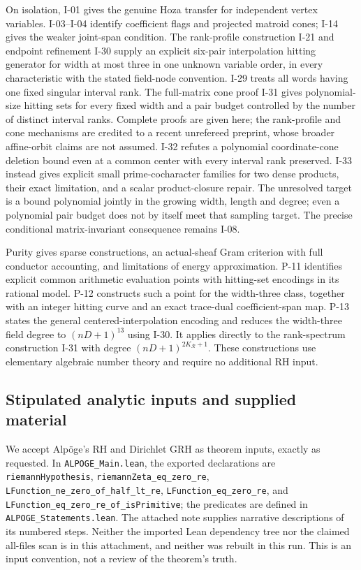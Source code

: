 \documentclass[11pt,a4paper]{article}
\theoremstyle{definition}\newtheorem{definition}{Definition}
\begin{document}
On isolation, I-01 gives the genuine Hoza transfer for independent vertex variables. I-03--I-04 identify coefficient flags and projected matroid cones; I-14 gives the weaker joint-span condition. The rank-profile construction I-21 and endpoint refinement I-30 supply an explicit six-pair interpolation hitting generator for width at most three in one unknown variable order, in every characteristic with the stated field-node convention. I-29 treats all words having one fixed singular interval rank. The full-matrix cone proof I-31 gives polynomial-size hitting sets for every fixed width and a pair budget controlled by the number of distinct interval ranks. Complete proofs are given here; the rank-profile and cone mechanisms are credited to a recent unrefereed preprint, whose broader affine-orbit claims are not assumed. I-32 refutes a polynomial coordinate-cone deletion bound even at a common center with every interval rank preserved. I-33 instead gives explicit small prime-cocharacter families for two dense products, their exact limitation, and a scalar product-closure repair. The unresolved target is a bound polynomial jointly in the growing width, length and degree; even a polynomial pair budget does not by itself meet that sampling target. The precise conditional matrix-invariant consequence remains I-08.

Purity gives sparse constructions, an actual-sheaf Gram criterion with full conductor accounting, and limitations of energy approximation. P-11 identifies explicit common arithmetic evaluation points with hitting-set encodings in its rational model. P-12 constructs such a point for the width-three class, together with an integer hitting curve and an exact trace-dual coefficient-span map. P-13 states the general centered-interpolation encoding and reduces the width-three field degree to $(nD+1)^{13}$ using I-30. It applies directly to the rank-spectrum construction I-31 with degree $(nD+1)^{2K_{\mathcal R}+1}$. These constructions use elementary algebraic number theory and require no additional RH input.

\subsection{Stipulated analytic inputs and supplied material}

We accept Alp\"oge's RH and Dirichlet GRH as theorem inputs, exactly as requested. In \nolinkurl{ALPOGE_Main.lean}, the exported declarations are \nolinkurl{riemannHypothesis}, \nolinkurl{riemannZeta_eq_zero_re}, \nolinkurl{LFunction_ne_zero_of_half_lt_re}, \nolinkurl{LFunction_eq_zero_re}, and \nolinkurl{LFunction_eq_zero_re_of_isPrimitive}; the predicates are defined in \nolinkurl{ALPOGE_Statements.lean}. The attached note supplies narrative descriptions of its numbered steps. Neither the imported Lean dependency tree nor the claimed all-files scan is in this attachment, and neither was rebuilt in this run. This is an input convention, not a review of the theorem's truth.
\end{document}
